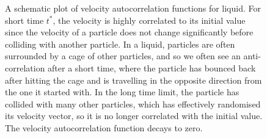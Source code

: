 \documentclass{article}
\theoremstyle{plain}\theoremheaderfont{\normalfont\bfseries}\theorembodyfont{\rmfamily}\theoremseparator{.}\newtheorem*{thm}{Theorem}\newtheorem*{law}{Law}\newtheorem*{pos}{Postulate}
\numberwithin{equation}{section}
\newcommand{\eval}[1]{\left\langle #1 \right\rangle}
\newcommand{\vb}[1]{\bm{\mathrm{#1}}}
\newcommand{\vdot}{\,\bm{\mathrm{\cdot}}\,}
\begin{document}
    \begin{figure}
        \centering
        \caption{A schematic plot of velocity autocorrelation functions for liquid. For short time \(t^*\), the velocity is highly correlated to its initial value since the velocity of a particle does not change significantly before colliding with another particle. In a liquid, particles are often surrounded by a cage of other particles, and so we often see an anti-correlation after a short time, where the particle has bounced back after hitting the cage and is travelling in the opposite direction from the one it started with. In the long time limit, the particle has collided with many other particles, which has effectively randomised its velocity vector, so it is no longer correlated with the initial value. The velocity autocorrelation function decays to zero.}
        \label{autocorrelation}
    \end{figure}
\end{document}
